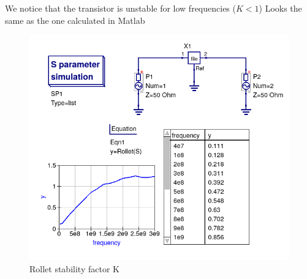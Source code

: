 \documentclass{article}
\begin{document}
\begin{multicols}{2}
\begin{enumerate}[label=(\alph*)]
We notice that the transistor is unstable for low frequencies ($K<1$)
Looks  the same as the one calculated in Matlab
\begin{figure}[H]
  \includegraphics[width=\linewidth]{tline8.png}
  \caption{Rollet stability factor K}
  \label{fig4}
\end{figure}


\end{enumerate}
\end{multicols}
\end{document}

